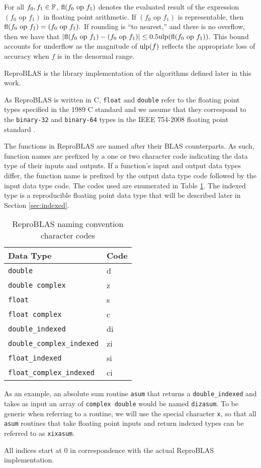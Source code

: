   For all $f_0, f_1 \in \mathbb{F}$, $\text{fl}(f_0 \text{ op } f_1)$ denotes the evaluated
  result of the expression $(f_0 \text{ op } f_1)$ in floating point
  arithmetic. If $(f_0 \text{ op } f_1)$ is representable, then
  \(
    \text{fl}(f_0 \text{ op } f_1) = (f_0 \text{ op } f_1).
  \)
  If rounding is ``to nearest,'' and there is no overflow, then we have that
  \(
    |\text{fl}(f_0 \text{ op } f_1) - (f_0 \text{ op } f_1)| \leq 0.5\text{ulp}(\text{fl}(f_0 \text{ op } f_1)).
  \)
  This bound accounts for underflow as the magnitude of $\text{ulp}(f)$ reflects the appropriate loss of accuracy when $f$ is in the denormal range.

  ReproBLAS is the library implementation of the algorithms defined later in this work.

  As ReproBLAS is written in C, \texttt{float} and \texttt{double} refer to the
  floating point types specified in the 1989 C standard \cite{c89} and we
  assume that they correspond to the \texttt{binary-32} and \texttt{binary-64}
  types in the IEEE 754-2008 floating point standard \cite{ieee754}.

  The functions in ReproBLAS are named after their BLAS counterparts.
  As such, function names are prefixed by a one or two character code indicating the data type of their inputs and outputs. If a function's input and output data types differ, the function name is prefixed by the output data type code followed by the input data type code.
  The codes used are enumerated in Table \ref{tbl:blas_naming_codes}. The indexed type is a reproducible floating point data type that will be described later in Section \ref{sec:indexed}.
  \begin{table}[!htbp]
    \caption{ReproBLAS naming convention character codes}
    \label{tbl:blas_naming_codes}
        \centering
        \begin{tabular}{ | l | l | } \hline
            Data Type & Code \\ \hline
            \texttt{double} & d \\ \hline
            \texttt{double complex} & z \\ \hline
            \texttt{float} & s \\ \hline
            \texttt{float complex} & c \\ \hline
            \texttt{double\_indexed} & di \\ \hline
            \texttt{double\_complex\_indexed} & zi \\ \hline
            \texttt{float\_indexed} & si \\ \hline
            \texttt{float\_complex\_indexed} & ci \\ \hline
        \end{tabular}
  \end{table}
  As an example, an absolute sum routine \texttt{asum} that returns a \texttt{double\_indexed} and takes as input an array of \texttt{complex double} would be named \texttt{dizasum}. To be generic when referring to a routine, we will use the special character \texttt{x}, so that all \texttt{asum} routines that take floating point inputs and return indexed types can be referred to as \texttt{xixasum}.

  All indices start at $0$ in correspondence with the actual ReproBLAS implementation.
